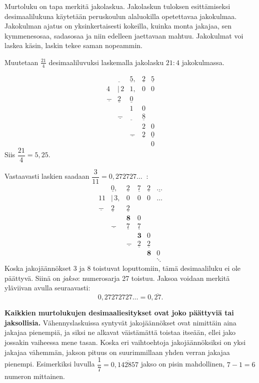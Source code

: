 Murtoluku on tapa merkitä jakolaskua. Jakolaskun tuloksen esittämiseksi desimaalilukuna
käytetään peruskoulun alaluokilla opetettavaa jakokulmaa. Jakokulman ajatus on yksinkertaisesti kokeilla, kuinka monta jakajaa, sen kymmenesosaa, sadasosaa ja niin
edelleen jaettavaan mahtuu. Jakokulmat voi laskea käsin, laskin tekee saman nopeammin.

\begin{esimerkki}
Muutetaan $\frac{21}{4}$ desimaaliluvuksi laskemalla jakolasku $21 : 4$ jakokulmassa.

\[ 
\begin{array}{cccccc}
 & \underline{ \ \ } & \underline{5}, & \underline{2} & \underline{5} \\
 4 & \!\!|\,2 & 1, & 0 & 0 \\
 \underline{-} & \underline{2}& \underline{0} \\
 & & 1 &0 \\
 & \underline{-} &\underline{ \ \ }  & \underline{8} \\
 & & & 2 & 0 \\
 & & \underline{-} & \underline{2} & \underline{0} \\
 & &  & & 0
\end{array}
\]
Siis $\dfrac{21}{4} = 5,25$.
\end{esimerkki}

Vastaavasti laskien saadaan $\dfrac{3}{11}=0,272727\ldots \ $ :
\[ 
\begin{array}{cccccc}
 & \underline{ 0}, & \underline{2} & \underline{7} & \underline{2} & 
 \underline{\ldots} \\
 11 & \!\!|\,3, & 0 & 0 & 0 & \ldots \\
 \underline{-} & \underline{2}& \underline{2} \\
 & & \boldsymbol{8} &0 \\
 & \underline{-} &\underline{ 7 }  & \underline{7} \\
 & & & \boldsymbol{3} & 0 \\
 & & \underline{-} & \underline{2} & \underline{2} \\
 & &  & & \boldsymbol{8} & 0 \\
 & & & & & \ddots
\end{array}
\]
Koska jakojäännökset 3 ja 8 toistuvat loputtomiin, tämä desimaaliluku
ei ole päättyvä. Siinä on \emph{jakso}: numerosarja 27 toistuu.
Jaksoa voidaan merkitä yläviivan avulla seuraavasti:
\[ 0,27272727\ldots = 0,\overline{27}. \]

{\bf Kaikkien murtolukujen desimaaliesitykset ovat joko päättyviä tai jaksollisia.}
Vähennyslaskuissa syntyvät jakojäännökset ovat nimittäin aina jakajaa pienempiä, ja siksi
ne alkavat väistämättä toistaa itseään, ellei jako jossakin vaiheessa mene tasan.
Koska eri vaihtoehtoja jakojäännöksiksi on yksi jakajaa vähemmän,
jakson pituus on suurimmillaan yhden verran jakajaa pienempi. Esimerkiksi luvulla
$\dfrac{1}{7}=0,\overline{142857}$ jakso on pisin mahdollinen, $7-1=6$ numeron mittainen.

